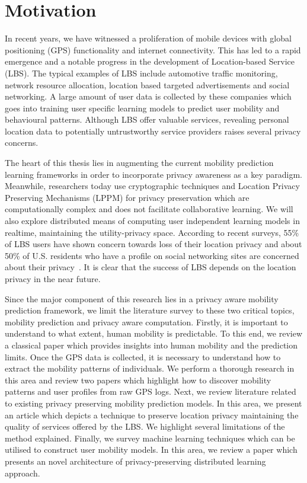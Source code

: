 \newpage
\section{Motivation} \label{motivation}
In recent years, we have witnessed a proliferation of mobile devices with global positioning 
(GPS) functionality and internet connectivity. This has led to a rapid emergence and a notable 
progress in the development of Location-based Service (LBS). The typical examples of LBS
include automotive traffic monitoring, network resource allocation, location based 
targeted advertisements and social networking. A large amount of user data is collected by these 
companies which goes into training user specific learning models to predict user mobility and
behavioural patterns. Although LBS offer valuable services, revealing personal location data to
potentially untrustworthy service providers raises several privacy concerns.\newline

The heart of this thesis lies in augmenting the current mobility prediction learning frameworks in order
to incorporate privacy awareness as a key paradigm. Meanwhile, researchers today use cryptographic
techniques and Location Privacy Preserving Mechanisms (LPPM) for privacy preservation which are 
computationally complex and does not facilitate collaborative learning. We will also explore 
distributed means of computing user independent learning models in realtime, maintaining the 
utility-privacy space. According to recent surveys, 55\% of LBS users have shown concern towards 
loss of their location privacy and about 50\% of U.S. residents who have a profile on social 
networking sites are concerned about their privacy~\cite{4511454}. It is clear that the success of LBS depends on 
the location privacy in the near future.\newline

Since the major component of this research lies in a privacy aware mobility prediction framework, we
limit the literature survey to these two critical topics, mobility prediction and privacy aware 
computation. Firstly, it is important to understand to what extent, human mobility is predictable. 
To this end, we review a classical paper which provides insights into human mobility and the 
prediction limits. Once the GPS data is collected, it is necessary to understand how to extract 
the mobility patterns of individuals. We perform a thorough research in this area and review two
papers which highlight how to discover mobility patterns and user profiles from raw GPS logs. Next, 
we review literature related to existing privacy preserving mobility prediction models. In this
area, we present an article which depicts a technique to preserve location privacy maintaining the 
quality of services offered by the LBS. We highlight several limitations of the method explained. 
Finally, we survey machine learning techniques which can be utilised to construct user mobility 
models. In this area, we review a paper which presents an novel architecture of privacy-preserving 
distributed learning approach.  



